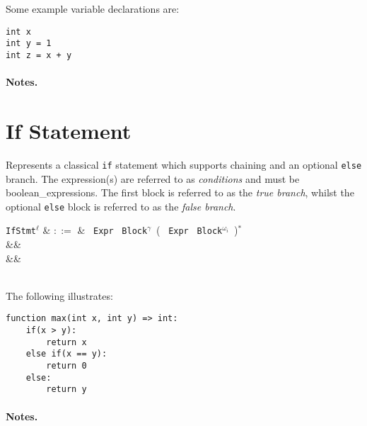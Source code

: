 \noindent Some example variable declarations are:
\begin{lstlisting}
int x
int y = 1
int z = x + y
\end{lstlisting}

\paragraph{Notes.} 



\section{If Statement}

Represents a classical \lstinline{if} statement which supports
chaining and an optional \lstinline{else} branch.  The expression(s)
are referred to as {\em conditions} and must be
\gls{boolean_expression}s.  The first block is referred to as the {\em
  true branch}, whilst the optional \lstinline{else} block is referred to as the {\em false branch}.

\begin{syntax}
  \verb+IfStmt+$^\ell$ & $::=$ & \ \verb+Expr+\ \token{:}
  \verb+Block+$^\gamma$\ \big(  \ \verb+Expr+\ \token{:}
  \verb+Block+$^{\omega_i}$\ \big)$^*$ \\
&& \\
&&\\
\\
\end{syntax}

\noindent The following illustrates:

\begin{lstlisting}
function max(int x, int y) => int:
    if(x > y):
        return x
    else if(x == y):
        return 0
    else:
        return y
\end{lstlisting}

\paragraph{Notes.} 


